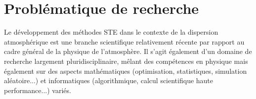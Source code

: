 %


\section{Problématique de recherche}

Le développement des méthodes STE dans le contexte de la dispersion atmosphérique est une branche scientifique relativement récente par rapport au cadre général de la physique de l'atmosphère. Il s'agit également d'un domaine de recherche largement pluridisciplinaire, mêlant des compétences en physique mais également sur des aspects mathématiques (optimisation, statistiques, simulation aléatoire...) et informatiques (algorithmique, calcul scientifique haute performance...) variés. \\

